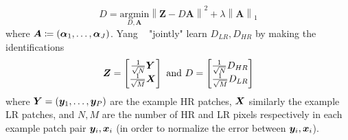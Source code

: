 \begin{equation}
	\hat{D} = \underset{D, \bm{A}}{\text{argmin}} \left\| \bm{Z} - D\bm{A} \right\|^2 + \lambda \left\| \bm{A} \right\|_1
\end{equation}
where $\bm{A} \coloneqq \left( \bm{\alpha}_1, \mathellipsis, \bm{\alpha}_J  \right)$.
%
Yang \etal~ "jointly" learn $D_{LR}, D_{HR}$ by making the identifications
\begin{equation*}
	\bm{Z} = \begin{bmatrix}
		\frac{1}{\sqrt{N}}\bm{Y} \\ \frac{1}{\sqrt{M}} \bm{X}
	\end{bmatrix} \text{ and }
	D = \begin{bmatrix}
		\frac{1}{\sqrt{N}} D_{HR} \\ \frac{1}{\sqrt{M}} D_{LR}
	\end{bmatrix}
\end{equation*}
where $\bm{Y} = \left( \bm{y}_1, \mathellipsis, \bm{y}_P \right)$ are the example HR patches, $\bm{X}$ similarly the example LR patches, and $N, M$ are the number of HR and LR pixels respectively in each example patch pair $\bm{y}_i, \bm{x}_i$ (in order to normalize the error between $\bm{y}_i, \bm{x}_i$).
